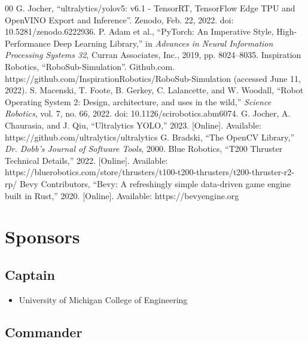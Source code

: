 \documentclass[conference]{IEEEtran}
\begin{document}
\clearpage
\begin{thebibliography}{00}
 G. Jocher, ``ultralytics/yolov5: v6.1 - TensorRT, TensorFlow Edge TPU and OpenVINO Export and Inference''. Zenodo, Feb. 22, 2022. doi: 10.5281/zenodo.6222936.
 P. Adam et al., ``PyTorch: An Imperative Style, High-Performance Deep Learning Library,'' in \textit{Advances in Neural Information Processing Systems 32}, Curran Associates, Inc., 2019, pp. 8024--8035.
 Inspiration Robotics, ``RoboSub-Simulation''. Github.com. https://github.com/InspirationRobotics/RoboSub-Simulation (accessed June 11, 2022).
 S. Macenski, T. Foote, B. Gerkey, C. Lalancette, and W. Woodall, ``Robot Operating System 2: Design, architecture, and uses in the wild,'' \textit{Science Robotics}, vol. 7, no. 66, 2022. doi: 10.1126/scirobotics.abm6074.
 G. Jocher, A. Chaurasia, and J. Qiu, ``Ultralytics YOLO,'' 2023. [Online]. Available: https://github.com/ultralytics/ultralytics
 G. Bradski, ``The OpenCV Library,'' \textit{Dr. Dobb's Journal of Software Tools}, 2000.
 Blue Robotics, ``T200 Thruster Technical Details,'' 2022. [Online]. Available: https://bluerobotics.com/store/thrusters/t100-t200-thrusters/t200-thruster-r2-rp/
 Bevy Contributors, ``Bevy: A refreshingly simple data-driven game engine built in Rust,'' 2020. [Online]. Available: https://bevyengine.org

\end{thebibliography}

\vspace{2em}

\appendices

\raggedbottom

\section{Sponsors}
\label{sec:sponsors}

\subsection{Captain}
\label{ssec:captain_sponsors}

\begin{itemize}
    \item University of Michigan College of Engineering
\end{itemize}

\subsection{Commander}
\label{ssec:commander_sponsors}
\end{document}
